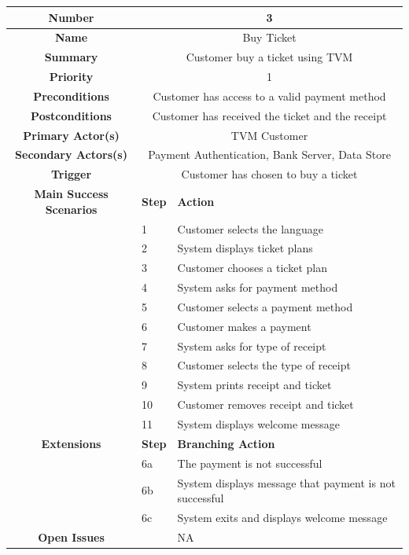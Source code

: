 \documentclass[a4paper,12pt]{report}
\begin{document}
\begin{tabular}{ | c | p{2cm} | p{7cm} |}
	
	\hline
	\textbf{Number} & \multicolumn{2}{c|}{3}  \\
	\hline
	\textbf{Name} & \multicolumn{2}{c|}{Buy Ticket}  \\
	\hline
	\textbf{Summary} & \multicolumn{2}{c|}{Customer buy a ticket using TVM}  \\
	\hline
	\textbf{Priority} & \multicolumn{2}{c|}{1}  \\
	\hline
	\textbf{Preconditions} & \multicolumn{2}{c|}{Customer has access to a valid payment method}  \\
	\hline
	\textbf{Postconditions} & \multicolumn{2}{c|}{Customer has received the ticket and the receipt}  \\
	\hline
	\textbf{Primary Actor(s)} & \multicolumn{2}{c|}{TVM Customer}  \\
	\hline
	\textbf{Secondary Actors(s)} & \multicolumn{2}{c|}{Payment Authentication, Bank Server, Data Store}  \\
	\hline
	\textbf{Trigger} & \multicolumn{2}{c|}{Customer has chosen to buy a ticket}  \\
	\hline
	\textbf{Main Success Scenarios} & \textbf{Step} & \textbf{Action} \\
	\hline
	& 1 & Customer selects the language \\ 
	\hline
	&  2  & System displays ticket plans \\
	\hline
	&  3  & Customer chooses a ticket plan \\
	\hline
	&  4  & System asks for payment method \\
	\hline
	&  5  & Customer selects a payment method \\
	\hline
	&  6  & Customer makes a payment \\
	\hline
	&  7  & System asks for type of receipt \\
	\hline
	&  8  & Customer selects the type of receipt \\
	\hline
	&  9  & System prints receipt and ticket \\
	\hline
	&  10  & Customer removes receipt and ticket \\
	\hline
	&  11  & System displays welcome message \\
	\hline
	\textbf{Extensions} & \textbf{Step} & \textbf{Branching Action} \\
	\hline
	&  6a  & The payment is not successful \\
	\hline
	&  6b  & System displays message that payment is not successful \\
	\hline
	&  6c  & System exits and displays welcome message \\
	\hline
	\textbf{Open Issues} &    & NA \\
	\hline
	
\end{tabular}
\end{document}
